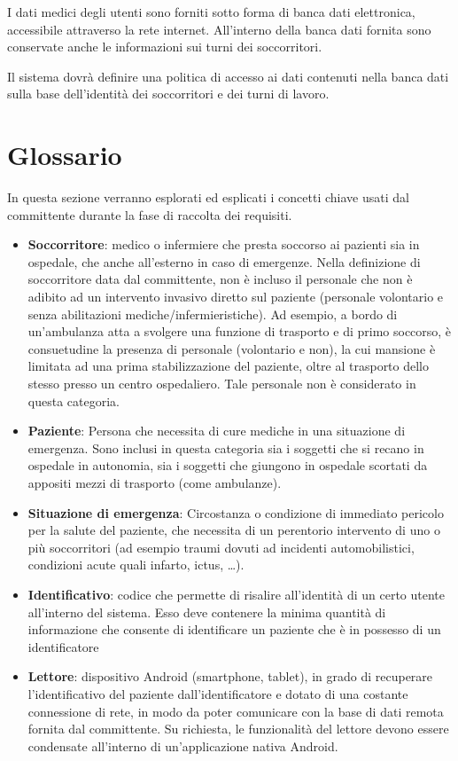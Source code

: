 \documentclass[a4paper,12pt]{report}
\begin{document}
I dati medici degli utenti sono forniti sotto forma di banca dati elettronica, accessibile attraverso la rete internet. All'interno della banca dati fornita sono conservate anche le informazioni sui turni dei soccorritori. 

Il sistema dovrà definire una politica di accesso ai dati contenuti nella banca dati sulla base dell'identità dei soccorritori e dei turni di lavoro. 

\section{Glossario} \label{glossary}
In questa sezione verranno esplorati ed esplicati i concetti chiave usati dal committente durante la fase di raccolta dei requisiti. 
\begin{itemize}
	\item \textbf{Soccorritore}: medico o infermiere che presta soccorso ai pazienti sia in ospedale, che anche all'esterno in caso di emergenze. Nella definizione di soccorritore data dal committente, non è incluso il personale che non è adibito ad un intervento invasivo diretto sul paziente (personale volontario e senza abilitazioni mediche/infermieristiche). Ad esempio, a bordo di un'ambulanza atta a svolgere una funzione di trasporto e di primo soccorso, è consuetudine la presenza di personale (volontario e non), la cui mansione è limitata ad una prima stabilizzazione del paziente, oltre al trasporto dello stesso presso un centro ospedaliero. Tale personale non è considerato in questa categoria.
	\item \textbf{Paziente}: Persona che necessita di cure mediche in una situazione di emergenza. Sono inclusi in questa categoria sia i soggetti che si recano in ospedale in autonomia, sia i soggetti che giungono in ospedale scortati da appositi mezzi di trasporto (come ambulanze).
	\item \textbf{Situazione di emergenza}: Circostanza o condizione di immediato pericolo per la salute del paziente, che necessita di un perentorio intervento di uno o più soccorritori (ad esempio traumi dovuti ad incidenti automobilistici, condizioni acute quali infarto, ictus, \dots).
	\item \textbf{Identificativo}: codice che permette di risalire all'identità di un certo utente all'interno del sistema. Esso deve contenere la minima quantità di informazione che consente di identificare un paziente che è in possesso di un identificatore
	\item \textbf{Lettore}: dispositivo Android (smartphone, tablet), in grado di recuperare l'identificativo del paziente dall'identificatore e dotato di una costante connessione di rete, in modo da poter comunicare con la base di dati remota fornita dal committente. Su richiesta, le funzionalità del lettore devono essere condensate all'interno di un'applicazione nativa Android.

\end{itemize}
\end{document}
